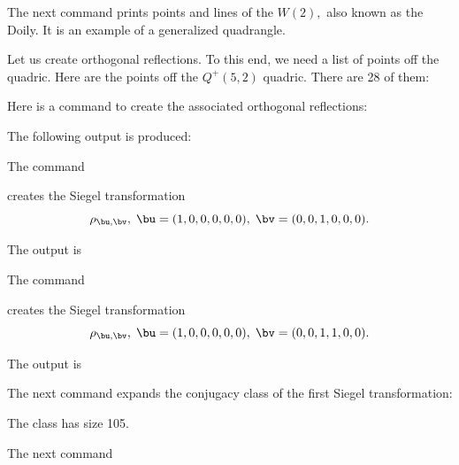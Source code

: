 The next command prints points and lines of the $W(2),$ also known as the Doily.
It is an example of a generalized quadrangle.



\bigskip

Let us create orthogonal reflections. 
To this end, we need a list of points off the quadric. 
Here are the points off the $Q^+(5,2)$ quadric. There are 28 of them:


Here is a command to create the associated orthogonal reflections:


\bigskip

The following output is produced:

\bigskip




\bigskip

The command 


creates the Siegel transformation 
$$
\rho_{\bu,\bv}, \; \bu = (1,0,0,0,0,0), \; \bv = (0,0,1,0,0,0).
$$

The output is

\bigskip





\bigskip



The command 


creates the Siegel transformation 
$$
\rho_{\bu,\bv}, \; \bu = (1,0,0,0,0,0), \; \bv = (0,0,1,1,0,0).
$$

The output is

\bigskip





\bigskip

The next command expands the conjugacy class of the first Siegel transformation:


The class has size 105.

The next command 

